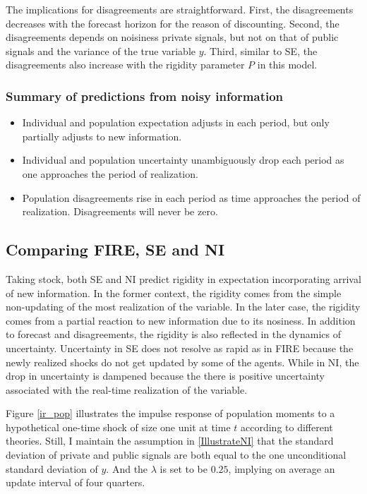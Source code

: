 \documentclass[]{article}
\begin{document}
	The implications for disagreements are straightforward. First, the disagreements decreases with the forecast horizon for the reason of discounting. Second, the disagreements depends on noisiness private signals, but not on that of public signals and the variance of the true variable $y$. Third, similar to SE, the disagreements also increase with the rigidity parameter $P$ in this model.
	
	\subsubsection{Summary of predictions from noisy information}
	
	\begin{itemize}
		\item Individual and population expectation adjusts in each period, but only partially adjusts to new information. 
		\item  Individual and population uncertainty unambiguously drop each period as one approaches the period of realization.  
		\item  Population disagreements rise in each period as time approaches the period of realization. Disagreements will never be zero. 
	\end{itemize}
	
	
	\subsection{Comparing FIRE, SE and NI}
	
	Taking stock, both SE and NI predict rigidity in expectation incorporating arrival of new information. In the former context, the rigidity comes from the simple non-updating of the most realization of the variable. In the later case, the rigidity comes from a partial reaction to new information due to its nosiness.  In addition to forecast and disagreements, the rigidity is also reflected in the dynamics of uncertainty.  Uncertainty in SE does not resolve as rapid as in FIRE because the newly realized shocks do not get updated by some of the agents. While in NI, the drop in uncertainty is dampened because the there is positive uncertainty associated with the real-time realization of the variable.  
	
	Figure \ref{ir_pop} illustrates the impulse response of population moments to a hypothetical one-time shock of size one unit at time $t$ according to different theories. Still, I maintain the assumption in \ref{IllustrateNI} that the standard deviation of private and public signals are both equal to the one unconditional standard deviation of $y$.  And the $\lambda$ is set to be $0.25$, implying on average an update interval of four quarters.  
	
\end{document}
